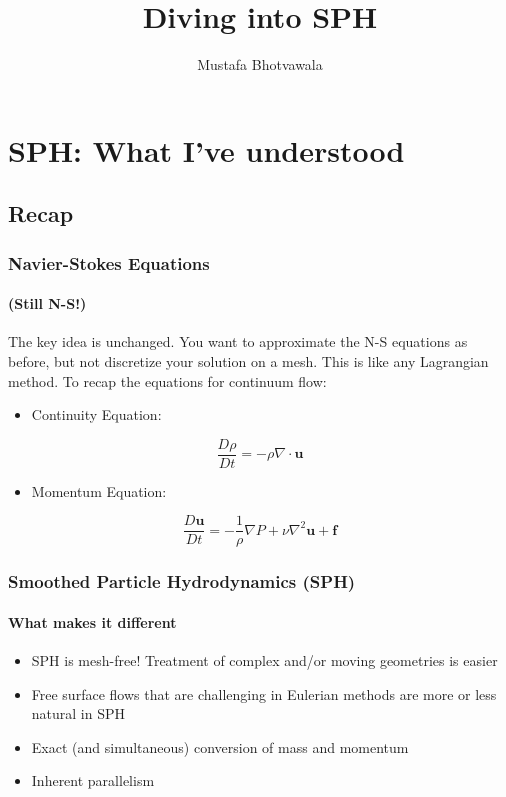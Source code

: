 \documentclass[notheorems, aspectratio=169]{beamer}
\title[Diving into SPH]{Diving into SPH}
\author{Mustafa Bhotvawala}
\institute[]{}
\date{}
\begin{document}
\begin{frame}
    \titlepage
\end{frame}


\section{SPH: What I've understood} 
\frame{\tableofcontents[currentsection]}

\subsection{Recap}

\begin{frame}[fragile]
  \frametitle{Navier-Stokes Equations}
  \framesubtitle{(Still N-S!)}
  
  The key idea is unchanged. You want to approximate the N-S equations as before, but not discretize your solution on a mesh. This is like any Lagrangian method. To recap the equations for continuum flow:
  
  \begin{itemize}
    \item Continuity Equation:
  \end{itemize}
  
  \[
  \frac{D\rho}{Dt} = -\rho \nabla \cdot \mathbf{u}
  \]
  
  \begin{itemize}
    \item Momentum Equation:
  \end{itemize}
  
  \[
  \frac{D\mathbf{u}}{Dt} = -\frac{1}{\rho}\nabla P + \nu\nabla^2\mathbf{u} + \mathbf{f}
  \]
  
  
  \end{frame}

  
\begin{frame}[fragile]
  \frametitle{Smoothed Particle Hydrodynamics (SPH)}
  \framesubtitle{What makes it different}
  
  \begin{itemize}
    \item SPH is mesh-free! Treatment of complex and/or moving geometries is easier
    \item Free surface flows that are challenging in Eulerian methods are more or less natural in SPH
    \item Exact (and simultaneous) conversion of mass and momentum
    \item Inherent parallelism
  \end{itemize}
  
  \end{frame}
  
\end{document}
